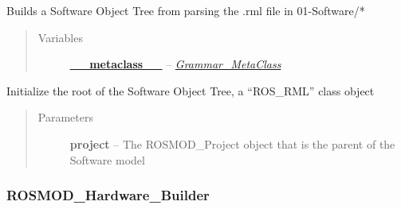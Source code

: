 \documentclass[letterpaper,10pt,english]{sphinxmanual}
\begin{document}
\begin{fulllineitems}
\label{class_Software_Builder:ROSMOD_Software_Builder}
Builds a Software Object Tree from parsing the .rml file in 01-Software/*
\begin{quote}\begin{description}
\item[{Variables}] \leavevmode
\href{http://docs.python.org/reference/datamodel.html\#\_\_metaclass\_\_}{\textbf{\_\_metaclass\_\_}} -- {\hyperref[class_Grammar_MetaClass:id1]{\emph{Grammar\_MetaClass}}}

\end{description}\end{quote}

\begin{fulllineitems}
\label{class_Software_Builder:ROSMOD_Software_Builder.__init__}
Initialize the root of the Software Object Tree, a ``ROS\_RML'' class object
\begin{quote}\begin{description}
\item[{Parameters}] \leavevmode
\textbf{project} -- The ROSMOD\_Project object that is the parent of the Software model

\end{description}\end{quote}

\end{fulllineitems}


\end{fulllineitems}



\subsubsection{ROSMOD\_Hardware\_Builder}
\label{class_Hardware_Builder:rosmod-hardware-builder}\label{class_Hardware_Builder::doc}
\end{document}
